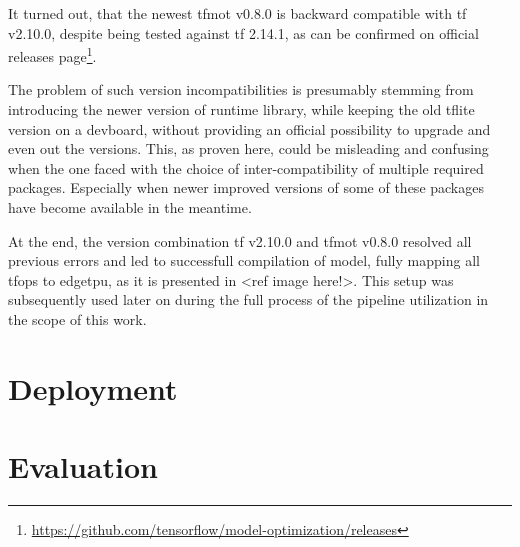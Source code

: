 {It turned out, that the newest \gls{tfmot} v0.8.0 is backward compatible with \gls{tf} v2.10.0, despite being tested against \gls{tf} 2.14.1,
as can be confirmed on official releases page\footnote{\url{https://github.com/tensorflow/model-optimization/releases}}.

The problem of such version incompatibilities is presumably stemming from introducing the newer version of  runtime library,
while keeping the old \gls{tflite} version on a \gls{devboard}, without providing an official possibility to upgrade and even out the versions.
This, as proven here, could be misleading and confusing when the one faced with the choice of inter-compatibility of multiple required packages.
Especially when newer improved versions of some of these packages have become available in the meantime.

At the end, the version combination \gls{tf} v2.10.0 and \gls{tfmot} v0.8.0 resolved all previous errors and led to successfull compilation of model,
fully mapping all \glspl{tfop} to \gls{edgetpu}, as it is presented in <ref image here!>.
This setup was subsequently used later on during the full process of the pipeline utilization in the scope of this work.


\section{Deployment}
\label{sec:deployment}



\section{Evaluation}
\label{sec:evaluation}


}